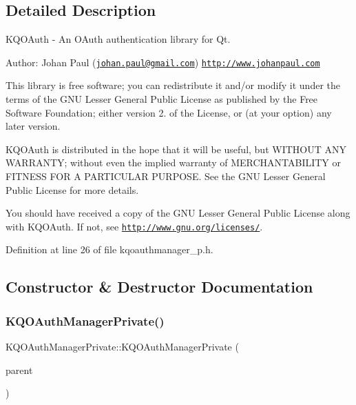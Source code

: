 \subsection{Detailed Description}
K\+Q\+O\+Auth -\/ An O\+Auth authentication library for Qt.

Author\+: Johan Paul (\href{mailto:johan.paul@gmail.com}{\tt johan.\+paul@gmail.\+com}) \href{http://www.johanpaul.com}{\tt http\+://www.\+johanpaul.\+com}

This library is free software; you can redistribute it and/or modify it under the terms of the G\+NU Lesser General Public License as published by the Free Software Foundation; either version 2. of the License, or (at your option) any later version.

K\+Q\+O\+Auth is distributed in the hope that it will be useful, but W\+I\+T\+H\+O\+UT A\+NY W\+A\+R\+R\+A\+N\+TY; without even the implied warranty of M\+E\+R\+C\+H\+A\+N\+T\+A\+B\+I\+L\+I\+TY or F\+I\+T\+N\+E\+SS F\+OR A P\+A\+R\+T\+I\+C\+U\+L\+AR P\+U\+R\+P\+O\+SE. See the G\+NU Lesser General Public License for more details.

You should have received a copy of the G\+NU Lesser General Public License along with K\+Q\+O\+Auth. If not, see \href{http://www.gnu.org/licenses/}{\tt http\+://www.\+gnu.\+org/licenses/}. 

Definition at line 26 of file kqoauthmanager\+\_\+p.\+h.



\subsection{Constructor \& Destructor Documentation}
\mbox{\label{class_k_q_o_auth_manager_private_adecc49ccb0a6c6f48a48dc7ab54e89e9}} 
\subsubsection{\texorpdfstring{K\+Q\+O\+Auth\+Manager\+Private()}{KQOAuthManagerPrivate()}}
{\footnotesize\ttfamily K\+Q\+O\+Auth\+Manager\+Private\+::\+K\+Q\+O\+Auth\+Manager\+Private (\begin{DoxyParamCaption}\item[{\hyperlink{class_k_q_o_auth_manager}{K\+Q\+O\+Auth\+Manager} $\ast$}]{parent }\end{DoxyParamCaption})}

